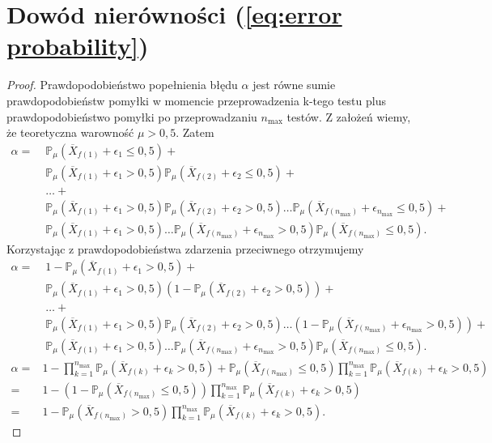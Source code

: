 \documentclass[inzynierska]{pwr_wmat_praca_dyplomowa}
\theoremstyle{plain}
\numberwithin{theorem}{chapter}
\theoremstyle{definition}
\numberwithin{theorem}{chapter}
\newcommand{\probP}{\mathbb{P}}
\newcommand{\nmax}{n_{\text{max}}}
\begin{document}
\section{Dowód nierówności (\ref{eq:error probability})}
\begin{proof}\label{proof:error probability}
	 Prawdopodobieństwo popełnienia błędu $\alpha$ jest równe sumie prawdopodobieństw pomyłki w momencie przeprowadzenia k-tego testu plus prawdopodobieństwo pomyłki po przeprowadzaniu $\nmax$ testów. Z założeń wiemy, że teoretyczna warowność $\mu > 0,5$. Zatem
	\begin{align*}
		\alpha=\;
		&\probP_{\mu}(\overline{X}_{f(1)} + \epsilon_{1} \le 0,5) + \\
		&\probP_{\mu}(\overline{X}_{f(1)} + \epsilon_{1} > 0,5)\probP_{\mu}(\overline{X}_{f(2)} + \epsilon_{2} \le 0,5) +\\
		&\dots +\\
		&\probP_{\mu}(\overline{X}_{f(1)} + \epsilon_{1} > 0,5)\probP_{\mu}(\overline{X}_{f(2)} + \epsilon_{2} > 0,5)\dots  \probP_{\mu}(\overline{X}_{f(\nmax)}+ \epsilon_{\nmax} \le 0,5)+\\
		&\probP_{\mu}(\overline{X}_{f(1)} + \epsilon_{1} > 0,5)\dots  \probP_{\mu}(\overline{X}_{f(\nmax)}+ \epsilon_{\nmax} > 0,5)\probP_{\mu}(\overline{X}_{f(\nmax)} \le 0,5).
	\end{align*}
	Korzystając z prawdopodobieństwa zdarzenia przeciwnego otrzymujemy
	\begin{align*}
		\alpha=\;
		&1 - \probP_{\mu}(\overline{X}_{f(1)} + \epsilon_{1} > 0,5) + \\
		&\probP_{\mu}(\overline{X}_{f(1)} + \epsilon_{1} > 0,5)(1 - \probP_{\mu}(\overline{X}_{f(2)} + \epsilon_{2} > 0,5)) +\\
		&\dots +\\
		&\probP_{\mu}(\overline{X}_{f(1)} + \epsilon_{1} > 0,5)\probP_{\mu}(\overline{X}_{f(2)} + \epsilon_{2} > 0,5)\dots  (1-\probP_{\mu}(\overline{X}_{f(\nmax)}+ \epsilon_{\nmax} > 0,5))+\\
		&\probP_{\mu}(\overline{X}_{f(1)} + \epsilon_{1} > 0,5)\dots  \probP_{\mu}(\overline{X}_{f(\nmax)}+ \epsilon_{\nmax} > 0,5)\probP_{\mu}(\overline{X}_{f(\nmax)} \le 0,5).
	\end{align*}
	\begin{align*}
		\alpha =&  1- \prod^{\nmax}_{k=1} \probP_{\mu}(\overline{X}_{f(k)} +  \epsilon_{k} > 0,5)+ 
		\probP_{\mu}(\overline{X}_{f(\nmax)} \le 0,5)\prod^{\nmax}_{k=1} \probP_{\mu}(\overline{X}_{f(k)} +  \epsilon_{k} > 0,5)\\
		=& 1 - (1 - \probP_{\mu}(\overline{X}_{f(\nmax)} \le 0,5))
		\prod^{\nmax}_{k=1} \probP_{\mu}(\overline{X}_{f(k)} +  \epsilon_{k} > 0,5) \\
		=&1 -  \probP_{\mu}(\overline{X}_{f(\nmax)} > 0,5)
		\prod^{\nmax}_{k=1} \probP_{\mu}(\overline{X}_{f(k)} +  \epsilon_{k} > 0,5).
	\end{align*}
\end{proof}
\end{document}
